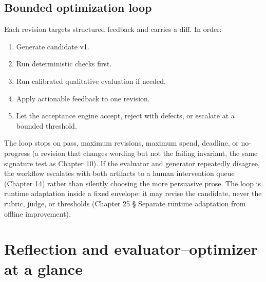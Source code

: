 \subsection{Bounded optimization loop}

Each revision targets structured feedback and carries a diff. In order:\par

\begin{enumerate}

\item Generate candidate v1.

\item Run deterministic checks first.

\item Run calibrated qualitative evaluation if needed.

\item Apply actionable feedback to one revision.

\item Let the acceptance engine accept, reject with defects, or escalate at a bounded threshold.

\end{enumerate}

The loop stops on pass, maximum revisions, maximum spend, deadline, or no-progress (a revision that changes wording but not the failing invariant, the same signature test as Chapter 10). If the evaluator and generator repeatedly disagree, the workflow escalates with both artifacts to a human intervention queue (Chapter 14) rather than silently choosing the more persuasive prose. The loop is runtime adaptation inside a fixed envelope: it may revise the candidate, never the rubric, judge, or thresholds (Chapter 25 § Separate runtime adaptation from offline improvement).\par

\section{Reflection and evaluator–optimizer at a glance}


